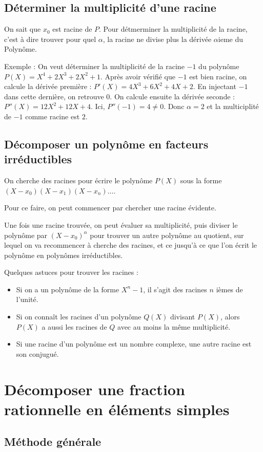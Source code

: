\documentclass[french]{yLectureNote}
\begin{document}
\subsection{Déterminer la multiplicité d'une racine}
On sait que $x_0$ est racine de $P$. Pour détmerminer la multiplicité de la racine, c'est à dire trouver pour quel $\alpha$, la racine ne divise plus la dérivée $\alpha$ieme du Polyn\^ome.

Exemple : On veut déterminer la multiplicité de la racine $-1$ du polyn\^ome $P(X) = X^4+2X^3+2X^2+1$. Après avoir vérifié que $-1$ est bien racine, on calcule la dérivée première : $P'(X) = 4X^3+6X^2+4X+2$. En injectant $-1$ dans cette dernière, on retrouve $0$. On calcule ensuite la dérivée seconde : $P''(X) = 12X^2+12X+4$. Ici, $P''(-1) = 4\neq0$. Donc $\alpha = 2$ et la multiciplité de $-1$ comme racine est $2$.
\subsection{Décomposer un polyn\^ome en facteurs irréductibles}
On cherche des racines pour écrire le polyn\^ome $P(X)$ sous la forme $(X-x_0)(X-x_1)(X-x_n)\dots$.

Pour ce faire, on peut commencer par chercher une racine évidente.

Une fois une racine trouvée, on peut évaluer sa multiplicité, puis diviser le polyn\^ome par $(X-x_0)^{\alpha}$ pour trouver un autre polyn\^ome au quotient, sur lequel on va recommencer à cherche des racines, et ce jusqu'à ce que l'on écrit le polyn\^ome en polyn\^omes irréductibles.

Quelques astuces pour trouver les racines :
\begin{itemize}
 \item Si on a un polyn\^ome de la forme $X^n-1$, il s'agit des racines $n$ ièmes de l'unité.
 \item Si on conna\^it les racines d'un polyn\^ome $Q(X)$ divisant $P(X)$, alors $P(X)$ a aussi les racines de $Q$ avec au moins la m\^eme multiplicité.
 \item Si une racine d'un polyn\^ome est un nombre complexe, une autre racine est son conjugué.
\end{itemize}


\section{Décomposer une fraction rationnelle en éléments simples}
\subsection{Méthode générale}
\end{document}
